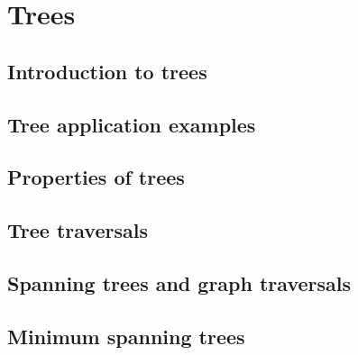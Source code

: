\section{Trees}
\subsection{Introduction to trees}
\subsection{Tree application examples}
\subsection{Properties of trees}
\subsection{Tree traversals}
\subsection{Spanning trees and graph traversals}
\subsection{Minimum spanning trees}